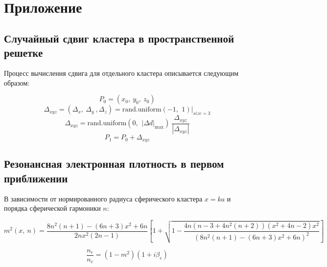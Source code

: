 \newpage
\section*{Приложение}
\subsection*{Случайный сдвиг кластера в пространственной решетке}

Процесс вычисления сдвига для отдельного кластера описывается следующим образом:

    \begin{equation}
        P_0 = (x_0,\:y_0,\:z_0)
        \label{random_shifts}
    \end{equation}
    \begin{equation*}
        \Delta_{xyz} = (\Delta_x,\: \Delta_y\:, \Delta_z) = \textrm{rand.uniform}\left( -1,\:\,1 \right)|_{size=3}
    \end{equation*}
    \begin{equation*}
        \Delta_{xyz} = \textrm{rand.uniform}\left(0,\:\,|\Delta d|_{\max} \right)\:\frac{\Delta_{xyz}}{|\Delta_{xyz}|}
    \end{equation*}
    \begin{equation*}
        P_1 = P_0 + \Delta_{xyz}
    \end{equation*}

\subsection*{Резонансная электронная плотность в первом приближении}

В зависимости от нормированного радиуса сферического кластера $x = ka$ и порядка сферической гармоники $n$:

\begin{equation}
    m^2 \left(x,\:n \right) = \frac{8n^2 (n + 1) - (6n + 3)x^2 + 6n}{2n x^2 (2n-1)} \left[ 1 + \sqrt{ 1 - \frac{4n (n-3 + 4n^2 (n + 2)) (x^2 + 4n-2) x^2}{{\left(8n^2 (n + 1) - (6n + 3)x^2 + 6n \right)}^{2}} } \right]
    \label{m2_resonance}
\end{equation}

\begin{equation}
    \frac{n_e}{n_c} = (1 - m^2) (1 + i \beta_e)
    \label{nenc_resonance}
\end{equation}